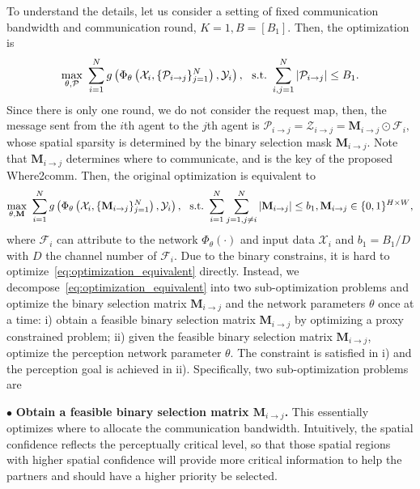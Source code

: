 \documentclass{article}
\begin{document}
To understand the details, let us consider a setting of fixed communication bandwidth and communication round, $K=1,B=[B_1]$. Then, the optimization is
\vspace{-1mm}
\begin{equation*}
    \underset{\theta,\mathcal{P}}{\max}~\sum_{i=1}^{N} 
    g \left(\Phi_{\theta} \left(\mathcal{X}_i,\{\mathcal{P}_{i\rightarrow j} \}_{j=1}^N \right), \mathcal{Y}_i  \right),~
    ~{\rm s.t.~} \sum_{i,j=1}^{N}|\mathcal{P}_{i\rightarrow j}| \leq B_1.
\end{equation*}
Since there is only one round, we do not consider the request map, then, the message sent from the $i$th agent to the $j$th agent is 
$\mathcal{P}_{i\rightarrow j}
= \mathcal{Z}_{i\rightarrow j} 
= \mathbf{M}_{i\rightarrow j} \odot \mathcal{F}_i,$ whose spatial sparsity is determined by the binary selection mask $\mathbf{M}_{i\rightarrow j}$. Note that $\mathbf{M}_{i\rightarrow j}$ determines where to communicate, and is the key of the proposed Where2comm. Then, the original optimization is equivalent to 
\begin{equation}
\label{eq:optimization_equivalent}
    \underset{\theta,\mathbf{M}}{\max}~\sum_{i=1}^{N} 
    g \left(\Phi_{\theta} \left(\mathcal{X}_i,\{\mathbf{M}_{i\rightarrow j}\}_{j=1}^N 
    \right), \mathcal{Y}_i  \right),~
    ~{\rm s.t.~} \sum_{i=1}^{N}\sum_{j=1,j\neq i}^{N}|\mathbf{M}_{i\rightarrow j}| \leq b_1, \mathbf{M}_{i\rightarrow j}\in\{0,1\}^{H\times W},
\end{equation}
where $\mathcal{F}_i$ can attribute to the network $\Phi_{\theta}(\cdot)$ and input data $\mathcal{X}_i$ and $b_1 = B_1/D$ with $D$ the channel number of $\mathcal{F}_i$. Due to the binary constrains, it is hard to optimize~\eqref{eq:optimization_equivalent} directly. Instead, we decompose~\eqref{eq:optimization_equivalent} into two sub-optimization problems and optimize the binary selection matrix  $\mathbf{M}_{i\rightarrow j}$ and the network parameters $\theta$ once at a time: i) obtain a feasible binary selection matrix $\mathbf{M}_{i\rightarrow j}$ by optimizing a proxy constrained problem; ii) given the feasible binary selection matrix $\mathbf{M}_{i\rightarrow j}$, optimize the perception network parameter $\theta$. The constraint is satisfied in i) and the perception goal is achieved in ii). Specifically, two sub-optimization problems are

$\bullet $ \textbf{Obtain  a feasible binary selection matrix $\mathbf{M}_{i\rightarrow j}$.} This essentially optimizes where to allocate the communication bandwidth. Intuitively, the spatial confidence reflects the perceptually critical level, so that those spatial regions with higher spatial confidence will provide more critical information to help the partners and should have a higher priority be selected.
\end{document}
